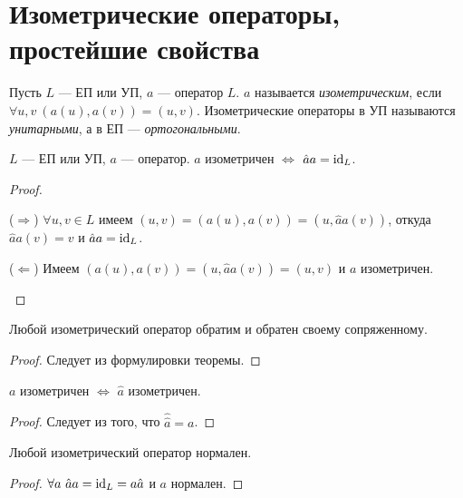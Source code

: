 \section{Изометрические операторы, простейшие свойства}

\begin{defn}
    Пусть $L$ --- ЕП или УП, $a$ --- оператор $L$. $a$ называется \textit{изометрическим}, если $\forall u, v\ (a(u), a(v)) = (u, v)$. Изометрические операторы в УП называются \textit{унитарными}, а в ЕП --- \textit{ортогональными}.
\end{defn}

\begin{thm*}
    $L$ --- ЕП или УП, $a$ --- оператор. $a$ изометричен $\Leftrightarrow$ $\hat{a} a = \operatorname{id}_L$.
\end{thm*}

\begin{proof}
    \begin{proofpart}{($\Rightarrow$)}
        $\forall u, v \in L$ имеем $(u, v) = (a(u), a(v)) = (u, \hat{a}a(v))$, откуда $\hat{a}a(v) = v$ и $\hat{a} a = \operatorname{id}_L$.
    \end{proofpart}

    \begin{proofpart}{($\Leftarrow$)}
        Имеем $(a(u), a(v)) = (u, \hat{a}a(v)) = (u, v)$ и $a$ изометричен.
    \end{proofpart}
\end{proof}

\begin{cor}
    Любой изометрический оператор обратим и обратен своему сопряженному.
\end{cor}

\begin{proof}
    Следует из формулировки теоремы.
\end{proof}

\begin{cor}
    $a$ изометричен $\Leftrightarrow$ $\hat{a}$ изометричен.
\end{cor}

\begin{proof}
    Следует из того, что $\hat{\hat{a}} = a$.
\end{proof}

\begin{cor}
    Любой изометрический оператор нормален.
\end{cor}

\begin{proof}
    $\forall a\ \hat{a} a = \operatorname{id}_L = a \hat{a}$ и $a$ нормален.
\end{proof}

